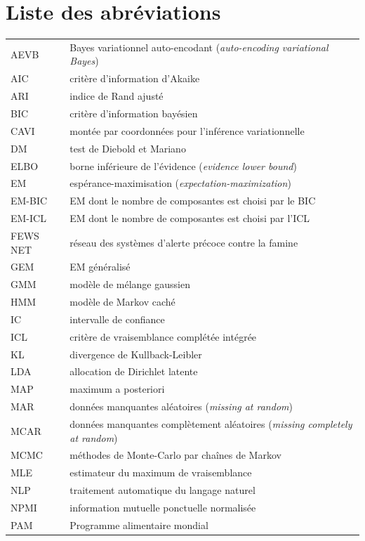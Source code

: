 \chapter*{Liste des abréviations}
\begin{tabular}{@{}ll@{}}
AEVB & Bayes variationnel auto-encodant (\emph{auto-encoding variational Bayes}) \\
AIC & critère d'information d'Akaike \\
ARI & indice de Rand ajusté \\
BIC & critère d'information bayésien \\
CAVI & montée par coordonnées pour l'inférence variationnelle \\
DM & test de Diebold et Mariano \\
ELBO & borne inférieure de l'évidence (\emph{evidence lower bound}) \\
EM & espérance-maximisation (\emph{expectation-maximization}) \\
EM-BIC & EM dont le nombre de composantes est choisi par le BIC \\
EM-ICL & EM dont le nombre de composantes est choisi par l'ICL \\
FEWS NET & réseau des systèmes d'alerte précoce contre la famine \\
GEM & EM généralisé \\
GMM & modèle de mélange gaussien \\
HMM & modèle de Markov caché \\
IC & intervalle de confiance \\
ICL & critère de vraisemblance complétée intégrée \\
KL & divergence de Kullback-Leibler \\
LDA & allocation de Dirichlet latente \\
MAP & maximum a posteriori \\
MAR & données manquantes aléatoires (\emph{missing at random}) \\
MCAR & données manquantes complètement aléatoires (\emph{missing completely at random}) \\
MCMC & méthodes de Monte-Carlo par chaînes de Markov \\
MLE & estimateur du maximum de vraisemblance \\
NLP & traitement automatique du langage naturel \\
NPMI & information mutuelle ponctuelle normalisée \\
PAM & Programme alimentaire mondial \\

\end{tabular}
